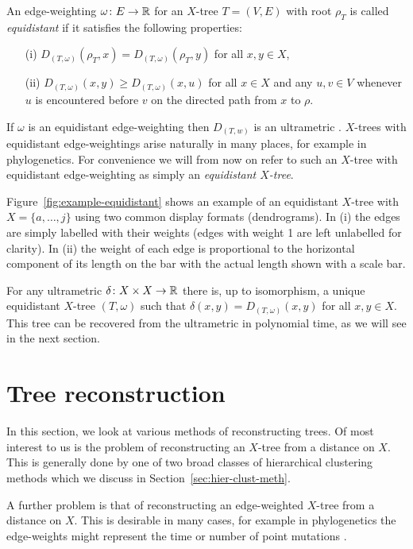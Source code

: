 An edge-weighting $\omega \colon E \to {\mathbb R}$ for an $X$-tree $T=(V,E)$ with
root $\rho_T$ is called \textit{equidistant} if it satisfies the following
properties:
\begin{itemize}
\item[(i)] $D_{(T,\omega)}(\rho_T,x) = D_{(T,\omega)}(\rho_T,y)$ for all $x,y
  \in X$,
\item[(ii)] $D_{(T,\omega)}(x,y) \geq D_{(T,\omega)}(x,u)$ for all $x \in X$
  and any $u,v \in V$ whenever $u$ is encountered before $v$ on the directed
  path from $x$ to $\rho$.
\end{itemize}
If $\omega$ is an equidistant edge-weighting then $D_{(T,w)}$ is an
ultrametric \cite[Lemma 7.2.4]{semple2003phylogenetics}.  $X$-trees with
equidistant edge-weightings arise naturally in many places, for example in
phylogenetics.  For convenience we will from now on refer to such an $X$-tree
with equidistant edge-weighting as simply an \textit{equidistant $X$-tree}.

Figure~\ref{fig:example-equidistant} shows an example of an equidistant
$X$-tree with $X = \{a, \dotsc, j\}$ using two common display formats
(dendrograms).  In (i) the edges are simply labelled with their weights (edges
with weight 1 are left unlabelled for clarity).  In (ii) the weight of each
edge is proportional to the horizontal component of its length on the bar with
the actual length shown with a scale bar.

For any ultrametric $\delta \colon X \times X \to {\mathbb R}$ there is, up to
isomorphism, a unique equidistant $X$-tree $(T,\omega)$ such that $\delta(x,y)
= D_{(T,\omega)}(x,y)$ for all $x,y \in X$.  This tree can be recovered from
the ultrametric in polynomial time, as we will see in the next section.

\section{Tree reconstruction}
\label{sec:tree-construction}

In this section, we look at various methods of reconstructing trees.  Of most
interest to us is the problem of reconstructing an $X$-tree from a distance on
$X$.  This is generally done by one of two broad classes of hierarchical
clustering methods which we discuss in Section~\ref{sec:hier-clust-meth}.

A further problem is that of reconstructing an edge-weighted $X$-tree from a
distance on $X$.  This is desirable in many cases, for example in
phylogenetics the edge-weights might represent the time or number of point
mutations \cite{felsenstein2004inferring}.

